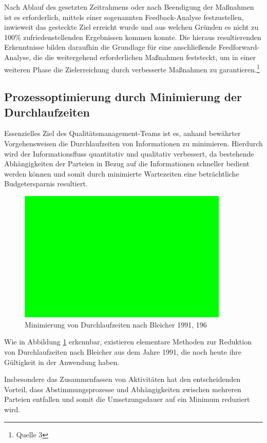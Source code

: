 Nach Ablauf des gesetzten Zeitrahmens oder nach Beendigung der Maßnahmen ist es erforderlich, mittels einer sogenannten Feedback-Analyse festzustellen, inwieweit das gesteckte Ziel erreicht wurde und aus welchen Gründen es nicht zu 100\% zufriedenstellenden Ergebnissen kommen konnte. Die hieraus resultierenden Erkenntnisse bilden daraufhin die Grundlage für eine anschließende Feedforward-Analyse, die die weitergehend erforderlichen Maßnahmen feststeckt, um in einer weiteren Phase die Zielerreichung durch verbesserte Maßnahmen zu garantieren.\footnote{Quelle 3}

\subsection{Prozessoptimierung durch Minimierung der Durchlaufzeiten}
Essenzielles Ziel des Qualitätsmanagement-Teams ist es, anhand bewährter Vorgehensweisen die Durchlaufzeiten von Informationen zu minimieren. Hierdurch wird der Informationsfluss quantitativ und qualitativ verbessert, da bestehende Abhängigkeiten der Parteien in Bezug auf die Informationen schneller bedient werden können und somit durch minimierte Wartezeiten eine beträchtliche Budgetersparnis resultiert.

\begin{figure}[h!]
	\centering
	\includegraphics[width=10cm]{kapitel/gruppe1_1/abbildungen/abbildung1}
	\caption{Minimierung von Durchlaufzeiten nach Bleicher 1991, 196}
	\label{fig_gruppe11_abbildung_1}
\end{figure}

Wie in Abbildung \ref{fig_gruppe11_abbildung_1} erkennbar, existieren elementare Methoden zur Reduktion von Durchlaufzeiten nach Bleicher aus dem Jahre 1991, die noch heute ihre Gültigkeit in der Anwendung haben.

Insbesondere das Zusammenfassen von Aktivitäten hat den entscheidenden Vorteil, dass Abstimmungsprozesse und Abhängigkeiten zwischen mehreren Parteien entfallen und somit die Umsetzungsdauer auf ein Minimum reduziert wird.\\

